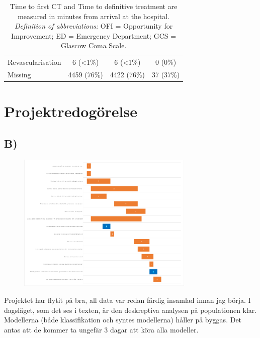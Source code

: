 \documentclass[12pt, a4paper]{article}
\begin{document}
\begin{appendices}
\begin{table}[t!]
{\begin{tabular}{lccc}
                \hspace{3mm}Revascularisation                 & 6 (\textless1\%)  & 6 (\textless1\%)  & 0 (0\%)       \\
                \hspace{3mm}Missing                           & 4459 (76\%)       & 4422 (76\%)       & 37 (37\%)     \\
                \bottomrule
            \end{tabular}
        }
        \caption*{\small Time to first CT and Time to definitive treatment are measured in minutes from arrival at the hospital.\\
            \textit{Definition of abbreviations:} OFI = Opportunity for Improvement; ED = Emergency Department; GCS = Glascow Coma Scale.}
    \end{table}
\end{appendices}

\section*{Projektredogörelse}

\subsection{B)}

\begin{figure}[ht]
    \centering
    \includegraphics[width=0.75\textwidth]{figures/gant.png}
\end{figure}

Projektet har flytit på bra, all data var redan färdig insamlad innan jag börja. I dagsläget, som det ses i texten, är den deskreptiva analysen på populationen klar. Modellerna (både klassifikation och syntes modellerna) håller på byggas. Det antas att de kommer ta ungefär 3 dagar att köra alla modeller.
\end{document}
